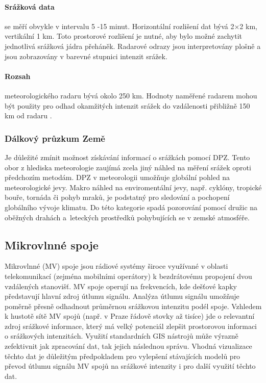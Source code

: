 \documentclass[a4paper,12pt,oneside]{report}
\begin{document}
\paragraph*{Srážková data} se měří obvykle v intervalu 5 -15
minut. Horizontální rozlišení dat bývá 2×2 km, vertikální 1 km. Toto
prostorové rozlišení je nutné, aby bylo možné zachytit jednotlivá
srážková jádra přeháněk. Radarové odrazy jsou interpretovány plošně a
jsou zobrazovány v barevné stupnici intenzit srážek.

\paragraph*{Rozsah} meteorologického radaru bývá okolo 250 km. Hodnoty
naměřené radarem mohou být použity pro odhad okamžitých intenzit
srážek do vzdálenosti přibližně 150 km od radaru \cite{kohout}.

\subsubsection{Dálkový průzkum Země}
Je důležité zmínit možnost získávání informací o srážkách pomocí
  \acs{DPZ}. Tento obor z hlediska meteorologie zaujímá zcela jiný
náhled na měření srážek oproti předchozím metodám. \acs{DPZ} v
meteorologii umožňuje globální pohled na meteorologické jevy. Makro
náhled na enviromentální jevy, např. cyklóny, tropické bouře, tornáda
či pohyb mraků, je podstatný pro sledování a pochopení globálního
vývoje klimatu. Do této kategorie spadá pozorování pomocí družic na
oběžných drahách a~leteckých prostředků pohybujících se v zemské
atmosféře.


\subsection{Mikrovlnné spoje}

Mikrovlnné (MV) spoje jsou rádiové systémy široce využívané v oblasti
telekomunikací (zejména mobilními operátory) k bezdrátovému propojení
dvou vzdálených stanovišť. MV spoje operují na frekvencích, kde
dešťové kapky představují hlavní zdroj útlumu signálu. Analýza útlumu
signálu umožňuje poměrně přesně odhadnout průměrnou srážkovou
intenzitu podél spoje. Vzhledem k hustotě sítě MV spojů (např. v Praze
řádově stovky až tisíce) jde o relevantní zdroj srážkové informace,
který má velký potenciál zlepšit prostorovou informaci o srážkových
intenzitách. Využití standardních GIS nástrojů může výrazně
zefektivnit jak zpracování dat, tak jejich následnou správu.  Vhodná
vizualizace těchto dat je důležitým předpokladem pro vylepšení
stávajících modelů pro převod útlumu signálu MV spojů na srážkové
intenzity i pro další využití těchto dat.
\end{document}
